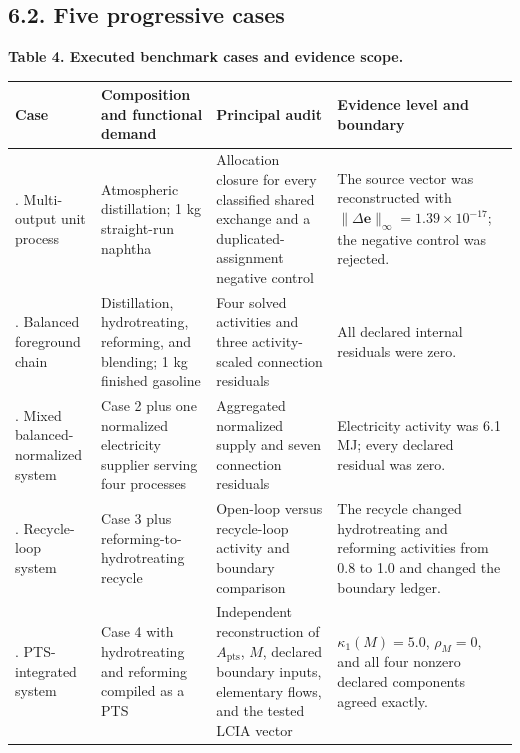 \documentclass[
  10pt,
  a4paper,
  DIV=11,
  numbers=noendperiod]{scrartcl}
\newcounter{none} %
\begin{document}
\newpage

\subsection{6.2. Five progressive cases}\label{five-progressive-cases}

\textbf{Table 4. Executed benchmark cases and evidence scope.}

{\def\LTcaptype{none} %
\begin{longtable}[]{@{}
  >{\raggedright\arraybackslash}p{}
  >{\raggedright\arraybackslash}p{}
  >{\raggedright\arraybackslash}p{}
  >{\raggedright\arraybackslash}p{}@{}}
\toprule\noalign{}
\begin{minipage}[b]{\linewidth}\raggedright
Case
\end{minipage} & \begin{minipage}[b]{\linewidth}\raggedright
Composition and functional demand
\end{minipage} & \begin{minipage}[b]{\linewidth}\raggedright
Principal audit
\end{minipage} & \begin{minipage}[b]{\linewidth}\raggedright
Evidence level and boundary
\end{minipage} \\
\midrule\noalign{}
\endhead
\bottomrule\noalign{}
\endlastfoot
1. Multi-output unit process & Atmospheric distillation; 1 kg
straight-run naphtha & Allocation closure for every classified shared
exchange and a duplicated-assignment negative control & The source
vector was reconstructed with
\(\lVert\Delta\mathbf e\rVert_\infty=1.39\times10^{-17}\); the negative
control was rejected. \\
2. Balanced foreground chain & Distillation, hydrotreating, reforming,
and blending; 1 kg finished gasoline & Four solved activities and three
activity-scaled connection residuals & All declared internal residuals
were zero. \\
3. Mixed balanced-normalized system & Case 2 plus one normalized
electricity supplier serving four processes & Aggregated normalized
supply and seven connection residuals & Electricity activity was 6.1 MJ;
every declared residual was zero. \\
4. Recycle-loop system & Case 3 plus reforming-to-hydrotreating recycle
& Open-loop versus recycle-loop activity and boundary comparison & The
recycle changed hydrotreating and reforming activities from 0.8 to 1.0
and changed the boundary ledger. \\
5. PTS-integrated system & Case 4 with hydrotreating and reforming
compiled as a PTS & Independent reconstruction of \(A_{\mathrm{pts}}\),
\(M\), declared boundary inputs, elementary flows, and the tested LCIA
vector & \(\kappa_1(M)=5.0\), \(\rho_M=0\), and all four nonzero
declared components agreed exactly. \\
\end{longtable}
}
\end{document}

